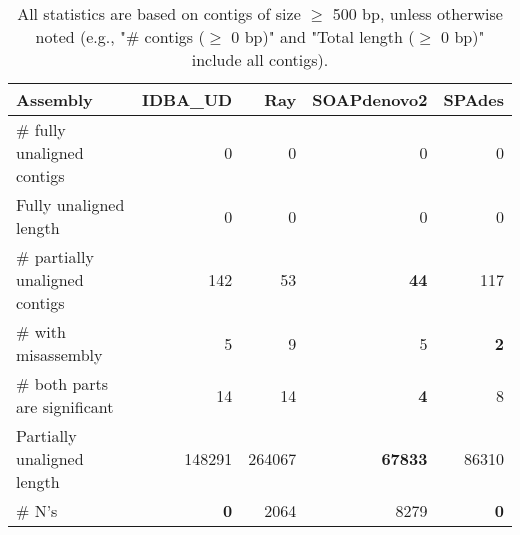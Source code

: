 \documentclass[12pt,a4paper]{article}
\begin{document}
\begin{table}[ht]
\begin{center}
\caption{All statistics are based on contigs of size $\geq$ 500 bp, unless otherwise noted (e.g., "\# contigs ($\geq$ 0 bp)" and "Total length ($\geq$ 0 bp)" include all contigs).}
\begin{tabular}{|l*{4}{|r}|}
\hline
Assembly & IDBA\_UD & Ray & SOAPdenovo2 & SPAdes \\ \hline
\# fully unaligned contigs & 0 & 0 & 0 & 0 \\ \hline
Fully unaligned length & 0 & 0 & 0 & 0 \\ \hline
\# partially unaligned contigs & 142 & 53 & {\bf 44} & 117 \\ \hline
\hspace{5mm}\# with misassembly & 5 & 9 & 5 & {\bf 2} \\ \hline
\hspace{5mm}\# both parts are significant & 14 & 14 & {\bf 4} & 8 \\ \hline
Partially unaligned length & 148291 & 264067 & {\bf 67833} & 86310 \\ \hline
\# N's & {\bf 0} & 2064 & 8279 & {\bf 0} \\ \hline
\end{tabular}
\end{center}
\end{table}
\end{document}
